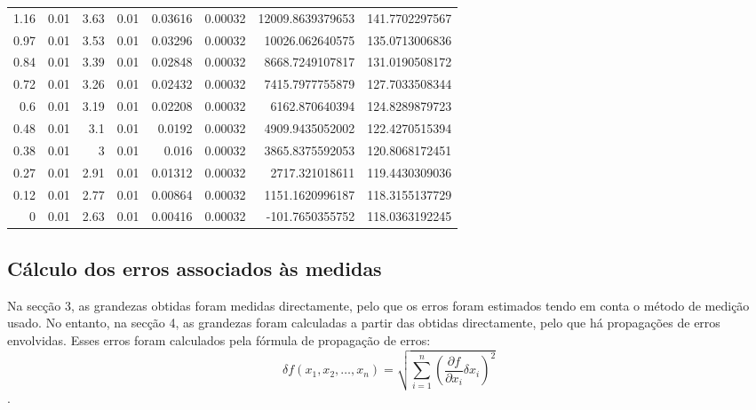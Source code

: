 \documentclass[a4paper]{article}
\begin{document}
\begin{table}[htbp]
\begin{tabular}{rlrlrlrl}
    1.16  & 0.01 & 3.63 & 0.01 & 0.03616  & 0.00032 & 12009.8639379653  & 141.7702297567 \\
    0.97  & 0.01 & 3.53 & 0.01 & 0.03296  & 0.00032 & 10026.062640575   & 135.0713006836 \\
    0.84  & 0.01 & 3.39 & 0.01 & 0.02848  & 0.00032 & 8668.7249107817   & 131.0190508172 \\
    0.72  & 0.01 & 3.26 & 0.01 & 0.02432  & 0.00032 & 7415.7977755879   & 127.7033508344 \\
    0.6   & 0.01 & 3.19 & 0.01 & 0.02208  & 0.00032 & 6162.870640394    & 124.8289879723 \\
    0.48  & 0.01 & 3.1  & 0.01 & 0.0192   & 0.00032 & 4909.9435052002   & 122.4270515394 \\
    0.38  & 0.01 & 3    & 0.01 & 0.016    & 0.00032 & 3865.8375592053   & 120.8068172451 \\
    0.27  & 0.01 & 2.91 & 0.01 & 0.01312  & 0.00032 & 2717.321018611    & 119.4430309036 \\
    0.12  & 0.01 & 2.77 & 0.01 & 0.00864  & 0.00032 & 1151.1620996187   & 118.3155137729 \\
    0     & 0.01 & 2.63 & 0.01 & 0.00416  & 0.00032 & -101.7650355752   & 118.0363192245 \\
\hline
\end{tabular}
\label{histerese}
\end{table}

\newpage
\subsection{Cálculo dos erros associados às medidas}
Na secção 3, as grandezas obtidas foram medidas directamente, pelo que os erros foram estimados tendo em conta o método de medição usado. No entanto, na secção 4, as grandezas foram calculadas a partir das obtidas directamente, pelo que há propagações de erros envolvidas. Esses erros foram calculados pela fórmula de propagação de erros: \begin{equation} \delta f(x_1,x_2,\ldots,x_n)=\sqrt{\sum_{i=1}^{n}\left( \frac{\partial f}{\partial x_i}\delta x_i \right)^2}\end{equation}.
\end{document}
